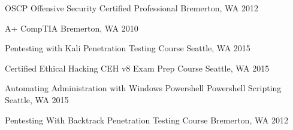 



\begin{cvhonors}


\cvhonor
{OSCP} %
{Offensive Security Certified Professional} %
{Bremerton, WA} %
{2012} %

\cvhonor
{A+} %
{CompTIA} %
{Bremerton, WA} %
{2010} %

\end{cvhonors}



\begin{cvhonors}


\cvhonor
{Pentesting with Kali} %
{Penetration Testing Course} %
{Seattle, WA} %
{2015} %

\cvhonor
{Certified Ethical Hacking} %
{CEH v8 Exam Prep Course} %
{Seattle, WA} %
{2015} %

\cvhonor
{Automating Administration with Windows Powershell} %
{Powershell Scripting} %
{Seattle, WA} %
{2015} %

\cvhonor
{Pentesting With Backtrack} %
{Penetration Testing Course} %
{Bremerton, WA} %
{2012} %

\end{cvhonors}
